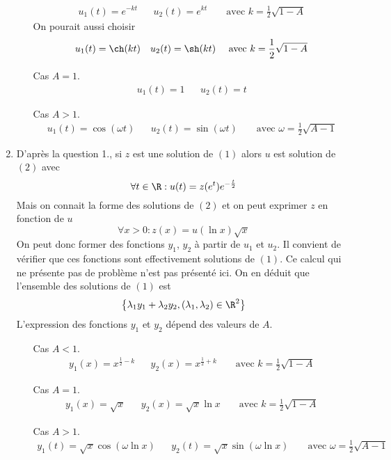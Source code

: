 \begin{enumerate}
\begin{itemize}
\begin{align*}
 u_1(t)=e^{-kt} & & u_2(t)=e^{kt} & &\text{ avec } k=\frac{1}{2}\sqrt{1-A} 
\end{align*}
On pourait aussi choisir
\begin{align*}
 u_1(t)=\ch(kt) & & u_2(t)=\sh(kt) & &\text{ avec } k=\frac{1}{2}\sqrt{1-A} 
\end{align*}
\item[Cas $A=1$.]
\begin{align*}
 u_1(t)=1 & & u_2(t)=t 
\end{align*}
\item[Cas $A>1$.]
\begin{align*}
 u_1(t)=\cos(\omega t) & & u_2(t)=\sin(\omega t) & &\text{ avec } \omega=\frac{1}{2}\sqrt{A-1} 
\end{align*}
\end{itemize}

\item D'après la question 1., si $z$ est une solution de $(1)$ alors $u$ est solution de $(2)$ avec
\begin{displaymath}
 \forall t \in \R : u(t)= z(e^t)e^{-\frac{t}{2}}
\end{displaymath}
Mais on connait la forme des solutions de $(2)$ et on peut exprimer $z$ en fonction de $u$
\begin{displaymath}
 \forall x >0 : z(x)=u(\ln x)\sqrt{x}
\end{displaymath}
 On peut donc former des fonctions $y_1$, $y_2$ à partir de $u_1$ et $u_2$. Il convient de vérifier que ces fonctions sont effectivement solutions de $(1)$. Ce calcul qui ne présente pas de problème n'est pas présenté ici. On en déduit que l'ensemble des solutions de $(1)$ est
\begin{displaymath}
 \left\lbrace \lambda_1y_1 + \lambda_2 y_2, (\lambda_1,\lambda_2)\in \R^2\right\rbrace 
\end{displaymath}
L'expression des fonctions $y_1$ et $y_2$ dépend des valeurs de $A$.
\begin{itemize}
 \item[Cas $A<1$.]
\begin{align*}
 y_1(x)=x^{\frac{1}{2}-k} & & y_2(x)=x^{\frac{1}{2}+k} & &\text{ avec } k=\frac{1}{2}\sqrt{1-A} 
\end{align*}

\item[Cas $A=1$.]
\begin{align*}
 y_1(x)=\sqrt{x} & & y_2(x)=\sqrt{x}\ln x & &\text{ avec } k=\frac{1}{2}\sqrt{1-A} 
\end{align*}
\item[Cas $A>1$.]
\begin{align*}
 y_1(t)=\sqrt{x}\cos(\omega \ln x) & & y_2(t)=\sqrt{x}\sin(\omega \ln x) & &\text{ avec } \omega=\frac{1}{2}\sqrt{A-1} 
\end{align*}
\end{itemize}

\end{enumerate}

